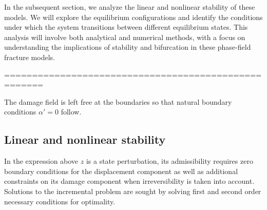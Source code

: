 

In the subsequent section, we analyze the linear and nonlinear stability of these models. We will explore the equilibrium configurations and identify the conditions under which the system transitions between different equilibrium states. This analysis will involve both analytical and numerical methods, with a focus on understanding the implications of stability and bifurcation in these phase-field fracture models.

=====================================================





% 
The damage field is left free at the boundaries so that natural boundary conditions $\alpha'=0$ follow. 

\subsection{Linear and nonlinear stability}

In the expression above $z$ is a state perturbation, its admissibility requires zero boundary conditions for the displacement component as well as additional constraints on its damage component when irreversibility is taken into account. 
Solutions to the incremental problem are sought by solving first and second order necessary conditions for optimality.

